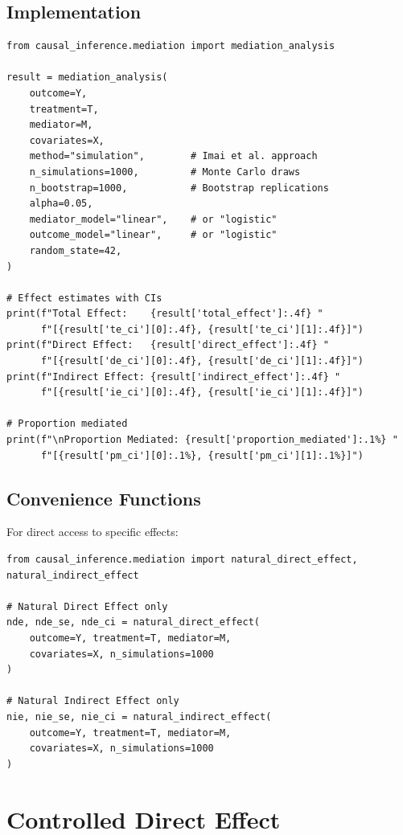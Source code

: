 \subsection{Implementation}

\begin{verbatim}
from causal_inference.mediation import mediation_analysis

result = mediation_analysis(
    outcome=Y,
    treatment=T,
    mediator=M,
    covariates=X,
    method="simulation",        # Imai et al. approach
    n_simulations=1000,         # Monte Carlo draws
    n_bootstrap=1000,           # Bootstrap replications
    alpha=0.05,
    mediator_model="linear",    # or "logistic"
    outcome_model="linear",     # or "logistic"
    random_state=42,
)

# Effect estimates with CIs
print(f"Total Effect:    {result['total_effect']:.4f} "
      f"[{result['te_ci'][0]:.4f}, {result['te_ci'][1]:.4f}]")
print(f"Direct Effect:   {result['direct_effect']:.4f} "
      f"[{result['de_ci'][0]:.4f}, {result['de_ci'][1]:.4f}]")
print(f"Indirect Effect: {result['indirect_effect']:.4f} "
      f"[{result['ie_ci'][0]:.4f}, {result['ie_ci'][1]:.4f}]")

# Proportion mediated
print(f"\nProportion Mediated: {result['proportion_mediated']:.1%} "
      f"[{result['pm_ci'][0]:.1%}, {result['pm_ci'][1]:.1%}]")
\end{verbatim}

\subsection{Convenience Functions}

For direct access to specific effects:

\begin{verbatim}
from causal_inference.mediation import natural_direct_effect, natural_indirect_effect

# Natural Direct Effect only
nde, nde_se, nde_ci = natural_direct_effect(
    outcome=Y, treatment=T, mediator=M,
    covariates=X, n_simulations=1000
)

# Natural Indirect Effect only
nie, nie_se, nie_ci = natural_indirect_effect(
    outcome=Y, treatment=T, mediator=M,
    covariates=X, n_simulations=1000
)
\end{verbatim}


\section{Controlled Direct Effect}

